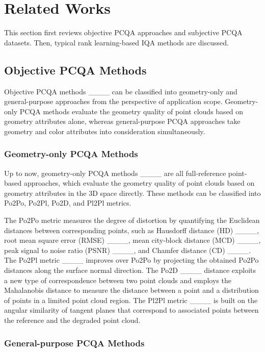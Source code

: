\section{Related Works}
\label{sec:Related Works}

This section first reviews objective PCQA approaches and subjective PCQA datasets.
Then, typical rank learning-based IQA methods are discussed.

\subsection{Objective PCQA Methods}
\label{subsec:spcqa}

Objective PCQA methods ____ can be classified into geometry-only and general-purpose approaches from the perspective of application scope.
Geometry-only PCQA methods evaluate the geometry quality of point clouds based on geometry attributes alone, whereas general-purpose PCQA approaches take geometry and color attributes into consideration simultaneously.

\subsubsection{Geometry-only PCQA Methods}
\label{subsec:fr_method_details}
Up to now, geometry-only PCQA methods  ____ are all full-reference point-based approaches, which evaluate the geometry quality of point clouds based on geometry attributes in the 3D space directly.
These methods can be classified into Po2Po, Po2Pl, Po2D, and Pl2Pl metrics.

The Po2Po metric measures the degree of distortion by quantifying the Euclidean distances between corresponding points, such as Hausdorff distance (HD) ____, root mean square error (RMSE) ____, mean city-block distance (MCD) ____, peak signal to noise ratio (PSNR) ____, and Chamfer distance (CD) ____.
The Po2Pl metric ____ improves over Po2Po by projecting the obtained Po2Po distances along the surface normal direction.%
The Po2D ____ distance exploits a new type of correspondence between two point clouds and employs the Mahalanobis distance to measure the distance between a point and a distribution of points in a limited point cloud region.
The Pl2Pl metric ____ is built on the angular similarity of tangent planes that correspond to associated points between the reference and the degraded point cloud.

\subsubsection{General-purpose PCQA Methods}

